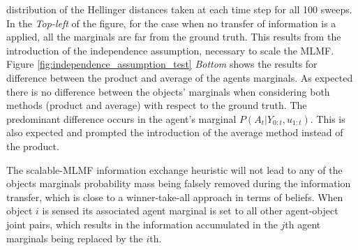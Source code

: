 distribution of the Hellinger distances taken at each time step for all 100 sweeps. In the \textit{Top-left} of the figure, 
for the case when no transfer of information is a applied, all the marginals are far from the 
ground truth. This results from the introduction of the independence assumption, necessary to scale the MLMF. 
Figure \ref{fig:independence_assumption_test} \textit{Bottom} shows the results for difference between the product and average of the agents
marginals. As expected there is no difference between the objects' marginals when considering both methods (product and average) with respect
to the ground truth. The predominant difference occurs in the agent's marginal $P(A_t|Y_{0:t},u_{1:t})$. This is also expected and 
prompted the introduction of the average method instead of the product. 

The scalable-MLMF information exchange heuristic will not lead to any of the objects marginals probability mass being falsely  
removed during the information transfer, which is close to a winner-take-all approach in terms of beliefs.
When object $i$ is sensed its associated agent marginal is set to all other agent-object joint pairs, which results in the 
information accumulated in the $j$th agent marginals being replaced by the $i$th.

